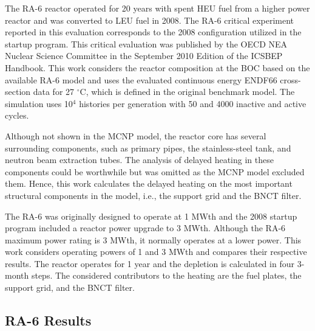 The RA-6 reactor operated for 20 years with spent \gls*{HEU} fuel from a higher power reactor and was converted to \gls*{LEU} fuel in 2008.
The RA-6 critical experiment reported in this evaluation corresponds to the 2008 configuration utilized in the startup program.
This critical evaluation was published by the OECD NEA Nuclear Science Committee in the September 2010 Edition of the ICSBEP Handbook.
This work considers the reactor composition at the \gls*{BOC} based on the available RA-6 model and uses the evaluated continuous energy ENDF66 cross-section data for 27 $^{\circ}$C, which is defined in the original benchmark model.
The simulation uses 10$^4$ histories per generation with 50 and 4000 inactive and active cycles.

Although not shown in the MCNP model, the reactor core has several surrounding components, such as primary pipes, the stainless-steel tank, and neutron beam extraction tubes.
The analysis of delayed heating in these components could be worthwhile but was omitted as the MCNP model excluded them.
Hence, this work calculates the delayed heating on the most important structural components in the model, i.e., the support grid and the BNCT filter.

The RA-6 was originally designed to operate at 1 MWth and the 2008 startup program included a reactor power upgrade to 3 MWth.
Although the RA-6 maximum power rating is 3 MWth, it normally operates at a lower power.
This work considers operating powers of 1 and 3 MWth and compares their respective results.
The reactor operates for 1 year and the depletion is calculated in four 3-month steps.
The considered contributors to the heating are the fuel plates, the support grid, and the BNCT filter.


\subsection{RA-6 Results}


